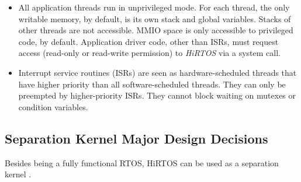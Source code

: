 \documentclass{AUJarticle}
\begin{document}
\begin{itemize}
\item
All application threads run in unprivileged mode. For each thread, the only writable memory,
by default, is its own stack and global variables. Stacks of other threads are not accessible.
MMIO space is only accessible to privileged code, by default. Application driver code, other
than ISRs, must request access (read-only or read-write permission) to \emph{HiRTOS} via a
system call.

\item Interrupt service routines (ISRs) are seen as hardware-scheduled threads that have higher
priority than all software-scheduled threads. They can only be preempted by higher-priority ISRs.
They cannot block waiting on mutexes or condition variables.
\end{itemize}

\subsection{Separation Kernel Major Design Decisions}

Besides being a fully functional RTOS, HiRTOS can be used as a separation kernel \cite{SepK}.
\end{document}
